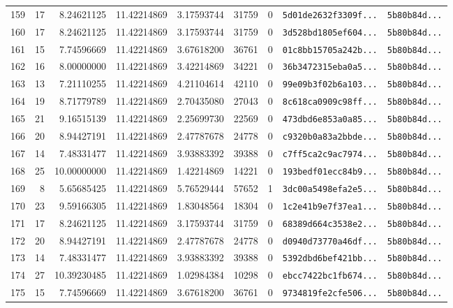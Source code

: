 \documentclass[10pt]{article}
\begin{document}
\begin{longtable}{rrrrrrrll}
  159 & 17 & 8.24621125 & 11.42214869 & 3.17593744 & 31759 & 0 & \texttt{5d01de2632f3309f...} & \texttt{5b80b84d...} \\
  160 & 17 & 8.24621125 & 11.42214869 & 3.17593744 & 31759 & 0 & \texttt{3d528bd1805ef604...} & \texttt{5b80b84d...} \\
  161 & 15 & 7.74596669 & 11.42214869 & 3.67618200 & 36761 & 0 & \texttt{01c8bb15705a242b...} & \texttt{5b80b84d...} \\
  162 & 16 & 8.00000000 & 11.42214869 & 3.42214869 & 34221 & 0 & \texttt{36b3472315eba0a5...} & \texttt{5b80b84d...} \\
  163 & 13 & 7.21110255 & 11.42214869 & 4.21104614 & 42110 & 0 & \texttt{99e09b3f02b6a103...} & \texttt{5b80b84d...} \\
  164 & 19 & 8.71779789 & 11.42214869 & 2.70435080 & 27043 & 0 & \texttt{8c618ca0909c98ff...} & \texttt{5b80b84d...} \\
  165 & 21 & 9.16515139 & 11.42214869 & 2.25699730 & 22569 & 0 & \texttt{473dbd6e853a0a85...} & \texttt{5b80b84d...} \\
  166 & 20 & 8.94427191 & 11.42214869 & 2.47787678 & 24778 & 0 & \texttt{c9320b0a83a2bbde...} & \texttt{5b80b84d...} \\
  167 & 14 & 7.48331477 & 11.42214869 & 3.93883392 & 39388 & 0 & \texttt{c7ff5ca2c9ac7974...} & \texttt{5b80b84d...} \\
  168 & 25 & 10.00000000 & 11.42214869 & 1.42214869 & 14221 & 0 & \texttt{193bedf01ecc84b9...} & \texttt{5b80b84d...} \\
  \rowcolor{cmpink!20} 169 & 8 & 5.65685425 & 11.42214869 & 5.76529444 & 57652 & 1 & \texttt{3dc00a5498efa2e5...} & \texttt{5b80b84d...} \\
  170 & 23 & 9.59166305 & 11.42214869 & 1.83048564 & 18304 & 0 & \texttt{1c2e41b9e7f37ea1...} & \texttt{5b80b84d...} \\
  171 & 17 & 8.24621125 & 11.42214869 & 3.17593744 & 31759 & 0 & \texttt{68389d664c3538e2...} & \texttt{5b80b84d...} \\
  172 & 20 & 8.94427191 & 11.42214869 & 2.47787678 & 24778 & 0 & \texttt{d0940d73770a46df...} & \texttt{5b80b84d...} \\
  173 & 14 & 7.48331477 & 11.42214869 & 3.93883392 & 39388 & 0 & \texttt{5392dbd6bef421bb...} & \texttt{5b80b84d...} \\
  174 & 27 & 10.39230485 & 11.42214869 & 1.02984384 & 10298 & 0 & \texttt{ebcc7422bc1fb674...} & \texttt{5b80b84d...} \\
  175 & 15 & 7.74596669 & 11.42214869 & 3.67618200 & 36761 & 0 & \texttt{9734819fe2cfe506...} & \texttt{5b80b84d...} \\

\end{longtable}
\end{document}
